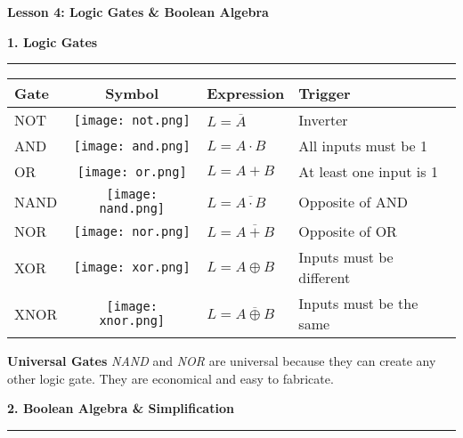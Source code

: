 \documentclass[a4paper, 8pt]{extarticle}
\newcommand{\sectionheading}[1]{\large\textbf{#1}\par\noindent\rule{\linewidth}{0.4pt}}
\newcommand{\subsectionheading}[1]{\normalsize\textbf{#1}}
\begin{document}
\pagestyle{empty} %

\begin{center}
    \fontsize{12pt}{14pt}\selectfont
    \textbf{Lesson 4: Logic Gates \& Boolean Algebra}
\end{center}
\vspace{1em}

\begin{multicols}{3}

\sectionheading{1. Logic Gates}
\vspace{0.5em}

\begin{tabularx}{\linewidth}{|l|c|X|X|}
\hline
\textbf{Gate} & \textbf{Symbol} & \textbf{Expression} & \textbf{Trigger} \\
\hline
NOT  & \texttt{[image: not.png]} & $L = \overline{A}$ & Inverter \\ \hline
AND  & \texttt{[image: and.png]} & $L = A \cdot B$ & All inputs must be 1 \\ \hline
OR   & \texttt{[image: or.png]} & $L = A + B$ & At least one input is 1 \\ \hline
NAND & \texttt{[image: nand.png]} & $L = \overline{A \cdot B}$ & Opposite of AND \\ \hline
NOR  & \texttt{[image: nor.png]} & $L = \overline{A + B}$ & Opposite of OR \\ \hline
XOR  & \texttt{[image: xor.png]} & $L = A \oplus B$ & Inputs must be different \\ \hline
XNOR & \texttt{[image: xnor.png]} & $L = \overline{A \oplus B}$ & Inputs must be the same \\ \hline
\end{tabularx}

\vspace{1em}
\begin{tcolorbox}
  \subsectionheading{Universal Gates}
  \vspace{0.25em}
  \textit{NAND} and \textit{NOR} are universal because they can create any other logic gate. They are economical and easy to fabricate.
\end{tcolorbox}
\columnbreak %

\sectionheading{2. Boolean Algebra \& Simplification}
\vspace{0.5em}


\end{multicols}
\end{document}

